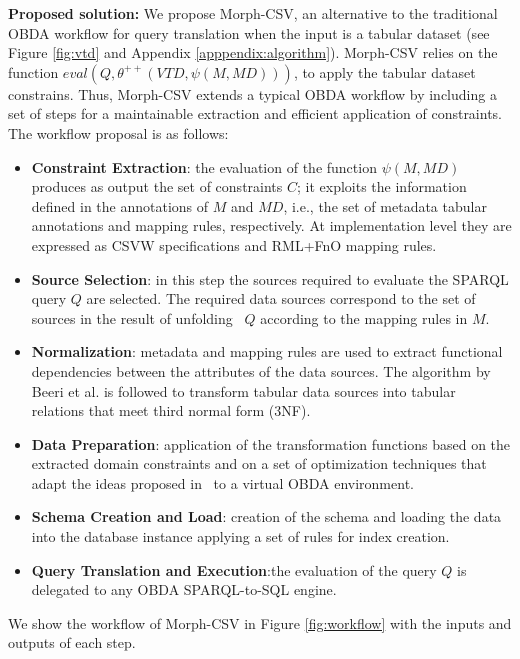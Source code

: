 \noindent\textbf{Proposed solution:} We propose Morph-CSV, an alternative to the traditional OBDA workflow for query translation when the input is a tabular dataset (see Figure \ref{fig:vtd} and Appendix \ref{apppendix:algorithm}). Morph-CSV relies on the function $eval(Q,\theta^{++}(VTD,\psi(M,MD)))$, to apply the tabular dataset constrains. Thus, Morph-CSV extends a typical OBDA workflow by including a set of steps for a maintainable extraction and efficient application of constraints. The workflow proposal is as follows:
\begin{itemize}
    \item \textbf{Constraint Extraction}: the evaluation of the function $\psi(M,MD)$ produces as output the set of constraints $C$; it exploits the information defined in the annotations of $M$ and $MD$, i.e., the set of metadata tabular annotations and mapping rules, respectively. At implementation level they are expressed as CSVW specifications and RML+FnO mapping rules. 
    \item \textbf{Source Selection}: in this step the sources required to evaluate the SPARQL query $Q$ are selected. The required data sources correspond to the set of sources in the result of unfolding~\citep{poggi2008linking} $Q$ according to the mapping rules in $M$. 
    \item \textbf{Normalization}: metadata and mapping rules are used to extract functional dependencies between the attributes of the data sources. The algorithm by Beeri et al. \citep{Beeri1978ASI} is followed to transform tabular data sources into tabular relations that meet third normal form (3NF).  
    \item \textbf{Data Preparation}: application of the transformation functions based on the extracted domain constraints and on a set of optimization techniques that adapt the ideas proposed in~\citep{jozashoori2019mapsdi,iglesias2020sdm,jozashoori2020funmap} to a virtual OBDA environment. 
    \item \textbf{Schema Creation and Load}: creation of the schema and loading the data into the database instance applying a set of rules for index creation. 
    \item \textbf{Query Translation and Execution}:the evaluation of the query $Q$ is delegated to any OBDA SPARQL-to-SQL engine.
\end{itemize}
 We show the workflow of Morph-CSV in Figure \ref{fig:workflow} with the inputs and outputs of each step. 


